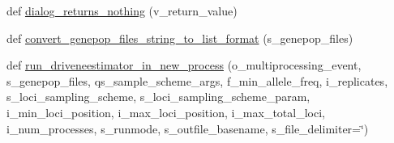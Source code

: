 \begin{DoxyCompactItemize}
\item 
def \hyperlink{namespacenegui_1_1pgutilities_aa839d4997d2bd2c15016c33cc7fce3b0}{dialog\+\_\+returns\+\_\+nothing} (v\+\_\+return\+\_\+value)
\item 
def \hyperlink{namespacenegui_1_1pgutilities_aed0f15b22462914445ffe1ec2a77cbc8}{convert\+\_\+genepop\+\_\+files\+\_\+string\+\_\+to\+\_\+list\+\_\+format} (s\+\_\+genepop\+\_\+files)
\item 
def \hyperlink{namespacenegui_1_1pgutilities_a4e8f98e83b41d19925860876d274beaa}{run\+\_\+driveneestimator\+\_\+in\+\_\+new\+\_\+process} (o\+\_\+multiprocessing\+\_\+event, s\+\_\+genepop\+\_\+files, qs\+\_\+sample\+\_\+scheme\+\_\+args, f\+\_\+min\+\_\+allele\+\_\+freq, i\+\_\+replicates, s\+\_\+loci\+\_\+sampling\+\_\+scheme, s\+\_\+loci\+\_\+sampling\+\_\+scheme\+\_\+param, i\+\_\+min\+\_\+loci\+\_\+position, i\+\_\+max\+\_\+loci\+\_\+position, i\+\_\+max\+\_\+total\+\_\+loci, i\+\_\+num\+\_\+processes, s\+\_\+runmode, s\+\_\+outfile\+\_\+basename, s\+\_\+file\+\_\+delimiter=\char`\"{})
\end{DoxyCompactItemize}
